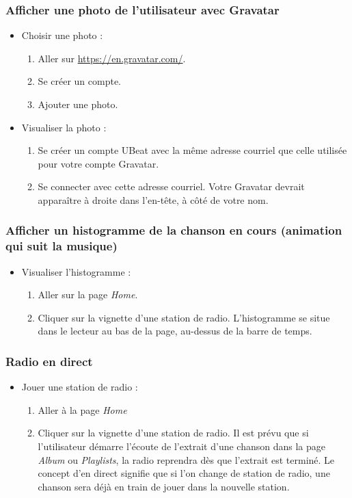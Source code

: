 \documentclass[12pt, letterpaper]{article}
\begin{document}
    \subsubsection*{Afficher une photo de l’utilisateur avec Gravatar}
    \begin{itemize}
        \item Choisir une photo :
        \begin{enumerate}
            \item Aller sur \url{https://en.gravatar.com/}.
            \item Se créer un compte.
            \item Ajouter une photo.
        \end{enumerate}

        \item Visualiser la photo :
        \begin{enumerate}
            \item Se créer un compte UBeat avec la même adresse courriel que celle utilisée pour votre compte Gravatar.
            \item Se connecter avec cette adresse courriel. Votre Gravatar devrait apparaître à droite dans l'en-tête, à côté de votre nom.
        \end{enumerate}
    \end{itemize}

    \subsubsection*{Afficher un histogramme de la chanson en cours (animation qui suit la musique)}
    \begin{itemize}
        \item Visualiser l'histogramme :
        \begin{enumerate}
            \item Aller sur la page \textit{Home}.
            \item Cliquer sur la vignette d'une station de radio. L'histogramme se situe dans le lecteur au bas de la page, au-dessus de la barre de temps.
        \end{enumerate}
    \end{itemize}

    \subsubsection*{Radio en direct}
    \begin{itemize}
        \item Jouer une station de radio :
        \begin{enumerate}
            \item Aller à la page \textit{Home}
            \item Cliquer sur la vignette d'une station de radio. Il est prévu que si l'utilisateur démarre l'écoute de l'extrait d'une chanson dans la page \textit{Album} ou \textit{Playlists}, la radio reprendra dès que l'extrait est terminé. Le concept d'en direct signifie que si l'on change de station de radio, une chanson sera déjà en train de jouer dans la nouvelle station.
        \end{enumerate}
    \end{itemize}
\end{document}
